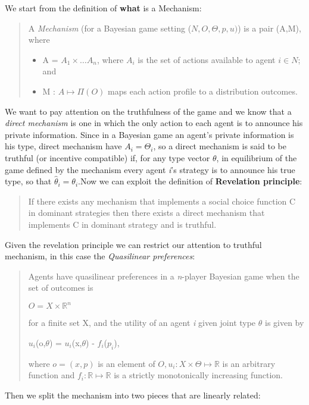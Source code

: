 \documentclass{article}
\begin{document}
\large{
We start from the definition of \textbf{what} is a Mechanism:
\begin{quote}
    A \textit{Mechanism} (for a Bayesian game setting ($N,O,\Theta,p,u)$) is a pair (A,M), where
    \begin{itemize}
        \item A = $A_1 \times \dots A_n$, where $A_i$ is the set of actions available to agent $i \in N$; and
        \item M : $A \mapsto \Pi(O)$ maps each action profile to a distribution outcomes.
    \end{itemize}
\end{quote}
We want to pay attention on the truthfulness of the game and we know that a \textit{direct mechanism} is one in which the only action to each agent is to announce his private information. Since in a Bayesian game an agent's private information is his type, direct mechanism have $A_i = \Theta_i$, so a direct mechanism is said to be truthful (or incentive compatible) if, for any type vector $\theta$, in equilibrium of the game defined by the mechanism every agent \textit{i}'s strategy is to announce his true type, so that $\hat{\theta}_i = \theta_i$.\newpage Now we can exploit the definition of \textbf{Revelation principle}:
\begin{quote}
    If there exists any mechanism that implements a social choice function C in dominant strategies then there exists a direct mechanism that implements C in dominant strategy and is truthful.
\end{quote}
Given the revelation principle we can restrict our attention to truthful mechanism, in this case the \textit{Quasilinear preferences}:
\begin{quote}
    Agents have quasilinear preferences in a \textit{n}-player Bayesian game when the set of outcomes is
    \begin{center}
        $O = X \times \mathbb{R}^n$
    \end{center}
    for a finite set X, and the utility of an agent \textit{i} given joint type $\theta$ is given by
    \begin{center}
        $u_i$(o,$\theta$) = $u_i$(x,$\theta$) - $f_i$($p_i$),
    \end{center}
    where $o = (x,p)$ is an element of $O, u_i : X \times \Theta \mapsto \mathbb{R}$ is an arbitrary function  and $f_i : \mathbb{R} \mapsto \mathbb{R}$ is a strictly monotonically increasing function.
\end{quote}
Then we split the mechanism into two pieces that are linearly related:
}
\end{document}
